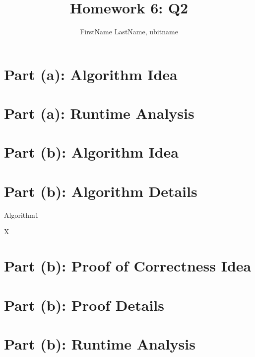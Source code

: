\documentclass{cse331}
\title{Homework 6: Q2}
\author{FirstName LastName, ubitname}
\begin{document}
\maketitle

\section{Part (a): Algorithm Idea}

\section{Part (a): Runtime Analysis}

\section{Part (b): Algorithm Idea}


\section{Part (b): Algorithm Details}


\begin{algorithm}


    \caption{\label{algo1} Algorithm1}
    \begin{algorithmic}[1]


        \Return X

        \EndProcedure
    \end{algorithmic}
\end{algorithm}

\section{Part (b): Proof of Correctness Idea}


\section{Part (b): Proof Details}


\section{Part (b): Runtime Analysis}

\end{document}
